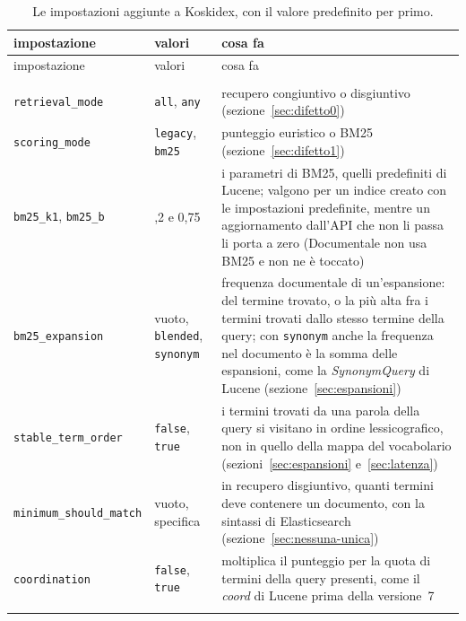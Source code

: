 {\footnotesize\renewcommand{\arraystretch}{0.92}
\begin{longtable}{>{\raggedright\arraybackslash}p{4.1cm}>{\raggedright\arraybackslash}p{2.5cm}>{\raggedright\arraybackslash}p{6cm}}
  \caption{Le impostazioni aggiunte a Koskidex, con il valore predefinito per
  primo.}\label{tab:impostazioni}\\
  \toprule
  impostazione & valori & cosa fa \\
  \midrule
  \endfirsthead
  \toprule
  impostazione & valori & cosa fa \\
  \midrule
  \endhead
  \bottomrule
  \endfoot
  \multicolumn{3}{l}{\emph{Recupero e punteggio lessicale}
  (capitolo~\ref{chapter:lessicale})} \\
  \texttt{retrieval\_mode} & \texttt{all}, \texttt{any} & recupero congiuntivo
  o disgiuntivo (sezione~\ref{sec:difetto0}) \\
  \texttt{scoring\_mode} & \texttt{legacy}, \texttt{bm25} & punteggio euristico
  o BM25 (sezione~\ref{sec:difetto1}) \\
  \texttt{bm25\_k1}, \texttt{bm25\_b} & 1,2 e 0,75 & i parametri di BM25, quelli
  predefiniti di Lucene; valgono per un indice creato con le impostazioni
  predefinite, mentre un aggiornamento dall'API che non li passa li porta a
  zero (Documentale non usa BM25 e non ne è toccato) \\
  \texttt{bm25\_expansion} & vuoto, \texttt{blended}, \texttt{synonym} &
  frequenza documentale di un'espansione: del termine trovato, o la più alta fra
  i termini trovati dallo stesso termine della query; con \texttt{synonym}
  anche la frequenza nel documento è la somma delle espansioni, come la
  \emph{SynonymQuery} di Lucene (sezione~\ref{sec:espansioni}) \\
  \texttt{stable\_term\_order} & \texttt{false}, \texttt{true} & i termini
  trovati da una parola della query si visitano in ordine lessicografico, non in
  quello della mappa del vocabolario (sezioni~\ref{sec:espansioni}
  e~\ref{sec:latenza}) \\
  \texttt{minimum\_should\_match} & vuoto, specifica & in recupero disgiuntivo,
  quanti termini deve contenere un documento, con la sintassi di Elasticsearch
  (sezione~\ref{sec:nessuna-unica}) \\
  \texttt{coordination} & \texttt{false}, \texttt{true} & moltiplica il
  punteggio per la quota di termini della query presenti, come il \emph{coord} di
  Lucene prima della versione~7 \\
  \midrule
  \multicolumn{3}{l}{\emph{Analisi lessicale}
}
\end{longtable}}
